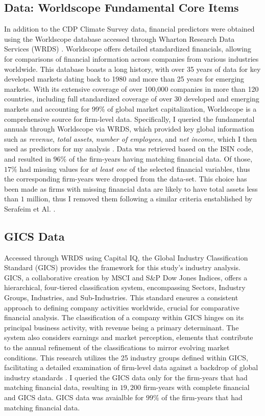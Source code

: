 \subsection{Data: Worldscope Fundamental Core Items}
In addition to the CDP Climate Survey data, financial predictors were obtained using the Worldscope database \cite{Worldscope_2} accessed through Wharton Research Data Services (WRDS) \cite{WRDS}. Worldscope offers detailed standardized financials, allowing for comparisons of financial information across companies from various industries worldwide. This database boasts a long history, with over 35 years of data for key developed markets dating back to 1980 and more than 25 years for emerging markets. With its extensive coverage of over 100,000 companies in more than 120 countries, including full standardized coverage of over 30 developed and emerging markets and accounting for 99\% of global market capitalization, Worldscope is a comprehensive source for firm-level data. Specifically, I queried the fundamental annuals through Worldscope via WRDS, which provided key global information such as \textit{revenue}, \textit{total assets}, \textit{number of employees}, and \textit{net income}, which I then used as predictors for my analysis \cite{Worldscope_2}. Data was retrieved based on the ISIN code, and resulted in $96\%$ of the firm-years having matching financial data. Of those, $17\%$ had missing values for \textit{at least one} of the selected financial variables, thus the corresponding firm-years were dropped from the data-set. This choice has been made as firms with missing financial data are likely to have total assets less than $1$ million, thus I removed them following a similar criteria enstablished by Serafeim et Al. \cite{Serafeim2019}.

 \subsection{GICS Data}
 Accessed through WRDS using Capital IQ, the Global Industry Classification Standard (GICS) provides the framework for this study's industry analysis. GICS, a collaborative creation by MSCI and S\&P Dow Jones Indices, offers a hierarchical, four-tiered classification system, encompassing Sectors, Industry Groups, Industries, and Sub-Industries. This standard ensures a consistent approach to defining company activities worldwide, crucial for comparative financial analysis. The classification of a company within GICS hinges on its principal business activity, with revenue being a primary determinant. The system also considers earnings and market perception, elements that contribute to the annual refinement of the classifications to mirror evolving market conditions. This research utilizes the 25 industry groups defined within GICS, facilitating a detailed examination of firm-level data against a backdrop of global industry standards \cite{GICS_MSCI, GICS_Wikipedia}. I queried the GICS data only for the firm-years that had matching financial data, resulting in $19,200$ firm-years with complete financial and GICS data. GICS data was avaialble for $99\%$ of the firm-years that had matching financial data.
 
